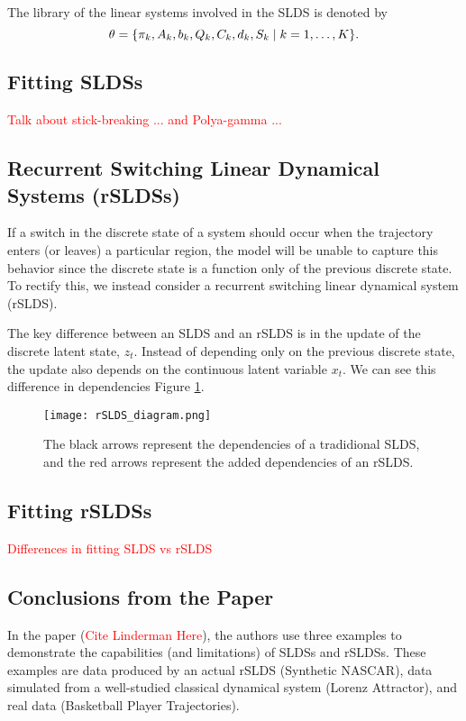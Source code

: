 The library of the linear systems involved in the SLDS is denoted by
\[\theta = {\left\{\pi_k, A_k, b_k, Q_k, C_k, d_k, S_k \mid k = 1, \dots, K\right\}}.\]

\subsection{Fitting SLDSs}

\textcolor{red}{Talk about stick-breaking ... and Polya-gamma ...}

\subsection{Recurrent Switching Linear Dynamical Systems (rSLDSs)}

If a switch in the discrete state of a system should occur when the trajectory enters (or leaves) a particular region, the model will be unable to capture this behavior since the discrete state is a function only of the previous discrete state. To rectify this, we instead consider a recurrent switching linear dynamical system (rSLDS). 

The key difference between an SLDS and an rSLDS is in the update of the  discrete latent state, $z_t$. Instead of depending only on the previous discrete state, the update also depends on the continuous latent variable $x_t$. We can see this difference in dependencies Figure \ref{rSLDS}.

\begin{figure}[h!]
	\centering
	\texttt{[image: rSLDS\_diagram.png]}
	\caption{The black arrows represent the dependencies of a tradidional SLDS, and the red arrows represent the added dependencies of an rSLDS.}
	\label{rSLDS}
\end{figure}

\subsection{Fitting rSLDSs} \textcolor{red}{Differences in fitting SLDS vs rSLDS}

\subsection{Conclusions from the Paper}

In the paper (\textcolor{red}{Cite Linderman Here}), the authors use three examples to demonstrate the capabilities (and limitations) of SLDSs and rSLDSs. These examples are data produced by an actual rSLDS (Synthetic NASCAR), data simulated from a well-studied classical dynamical system (Lorenz Attractor), and real data (Basketball Player Trajectories).

